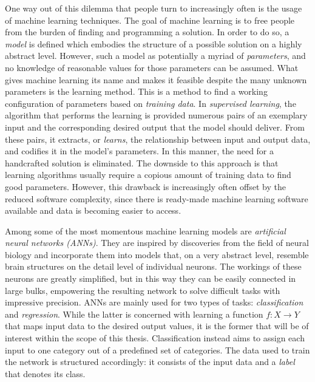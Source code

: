 \documentclass[11pt, a4paper]{article}
\begin{document}
One way out of this dilemma that people turn to increasingly often is the usage of machine learning techniques. The goal of machine learning is to free people from the burden of finding and programming a solution. In order to do so, a \emph{model} is defined which embodies the structure of a possible solution on a highly abstract level. However, such a model as potentially a myriad of \emph{parameters}, and no knowledge of reasonable values for those parameters can be assumed. What gives machine learning its name and makes it feasible despite the many unknown parameters is the learning method. This is a method to find a working configuration of parameters based on \emph{training data}. In \emph{supervised learning}, the algorithm that performs the learning is provided numerous pairs of an exemplary input and the corresponding desired output that the model should deliver. From these pairs, it extracts, or \emph{learns}, the relationship between input and output data, and codifies it in the model's parameters. In this manner, the need for a handcrafted solution is eliminated. The downside to this approach is that learning algorithms usually require a copious amount of training data to find good parameters. However, this drawback is increasingly often offset by the reduced software complexity, since  there is ready-made machine learning software available and data is becoming easier to access.

Among some of the most momentous machine learning models are \emph{artificial neural networks (ANNs)}. They are inspired by discoveries from the field of neural biology and incorporate them into models that, on a very abstract level, resemble brain structures on the detail level of individual neurons. The workings of these  neurons are greatly simplified, but in this way they can be easily connected in large bulks, empowering the resulting network to solve difficult tasks with impressive precision. ANNs are mainly used for two types of tasks: \emph{classification} and \emph{regression}. While the latter is concerned with learning a function $f: X \rightarrow Y$ that maps input data to the desired output values, it is the former that will be of interest within the scope of this thesis. Classification instead aims to assign each input to one category out of a predefined set of categories. The data used to train the network is structured accordingly: it consists of the input data and a \emph{label} that denotes its class.
\end{document}
